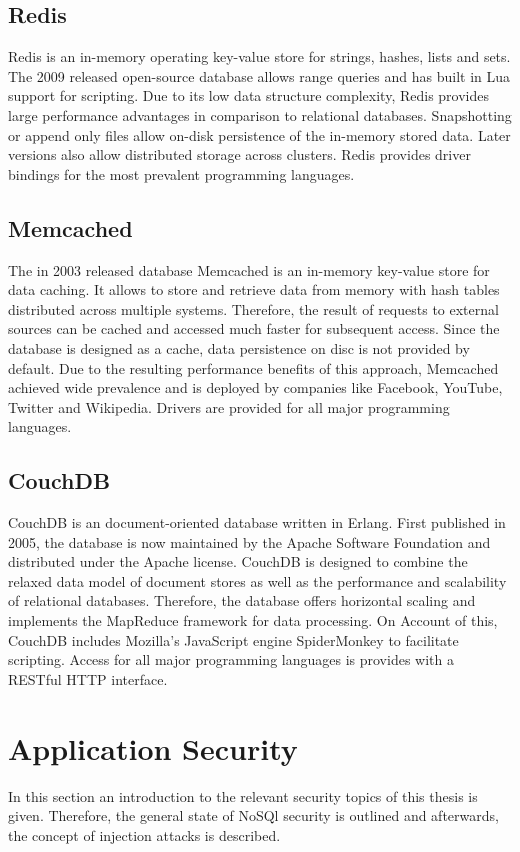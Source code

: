 \subsection{Redis}
Redis is an in-memory operating key-value store for strings, hashes, lists and sets. The 2009 released open-source database allows range queries and has built in Lua support for scripting. Due to its low data structure complexity, Redis provides large performance advantages in comparison to relational databases. Snapshotting or append only files allow on-disk persistence of the in-memory stored data. Later versions also allow distributed storage across clusters. Redis provides driver bindings for the most prevalent programming languages.

\subsection{Memcached}
The in 2003 released database Memcached is an in-memory key-value store for data caching. It allows to store and retrieve data from memory with hash tables distributed across multiple systems. Therefore, the result of requests to external sources can be cached and accessed much faster for subsequent access. Since the database is designed as a cache, data persistence on disc is not provided by default. Due to the resulting performance benefits of this approach, Memcached achieved wide prevalence and is deployed by companies like Facebook, YouTube, Twitter and Wikipedia. Drivers are provided for all major programming languages.


\subsection{CouchDB}
CouchDB is an document-oriented database written in Erlang. First published in 2005, the database is now maintained by the Apache Software Foundation and distributed under the Apache license. CouchDB is designed to combine the relaxed data model of document stores as well as the performance and scalability of relational databases. Therefore, the database offers horizontal scaling and implements the MapReduce framework for data processing. On Account of this, CouchDB includes Mozilla's JavaScript engine SpiderMonkey to facilitate scripting. Access for all major programming languages is provides with a RESTful HTTP interface. 

\section{Application Security}
In this section an introduction to the relevant security topics of this thesis is given. Therefore, the general state of NoSQl security is outlined and afterwards, the concept of injection attacks is described.

